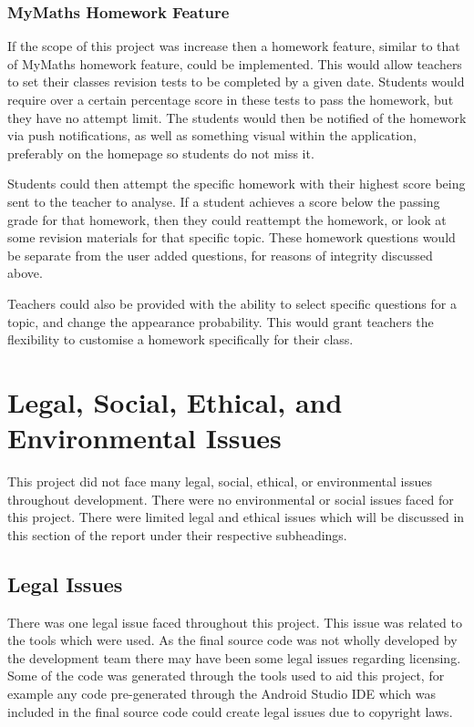 \documentclass{article}
\begin{document}
\subsubsection{MyMaths Homework Feature}

If the scope of this project was increase then a homework feature, similar to that of MyMaths homework feature, could be implemented. This would allow teachers to set their classes revision tests to be completed by a given date. Students would require over a certain percentage score in these tests to pass the homework, but they have no attempt limit. The students would then be notified of the homework via push notifications, as well as something visual within the application, preferably on the homepage so students do not miss it. \par

Students could then attempt the specific homework with their highest score being sent to the teacher to analyse. If a student achieves a score below the passing grade for that homework, then they could reattempt the homework, or look at some revision materials for that specific topic. These homework questions would be separate from the user added questions, for reasons of integrity discussed above. \par

Teachers could also be provided with the ability to select specific questions for a topic, and change the appearance probability. This would grant teachers the flexibility to customise a homework specifically for their class. \par

\section{Legal, Social, Ethical, and Environmental Issues}
\label{section:issues}

This project did not face many legal, social, ethical, or environmental issues throughout development. There were no environmental or social issues faced for this project. There were limited legal and ethical issues which will be discussed in this section of the report under their respective subheadings. 

\subsection{Legal Issues}

There was one legal issue faced throughout this project. This issue was related to the tools which were used. As the final source code was not wholly developed by the development team there may have been some legal issues regarding licensing. Some of the code was generated through the tools used to aid this project, for example any code pre-generated through the Android Studio IDE which was included in the final source code could create legal issues due to copyright laws. \par
\end{document}
